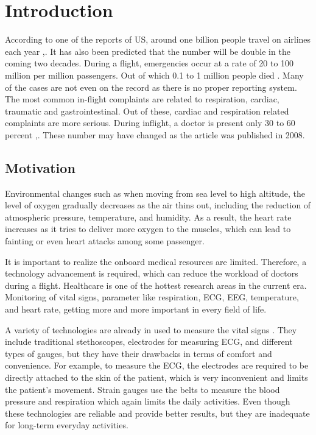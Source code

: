 \chapter{Introduction}

According to one of the reports of US, around one billion people travel on airlines each year \cite{PMC2577402},\cite{aerospace2003medical}. It has also been predicted that the number will be double in the coming two decades. During a flight, emergencies occur at a rate of 20 to 100 million per million passengers. Out of which 0.1 to 1 million people died \cite{lyznicki2000inflight}. Many of the cases are not even on the record as there is no proper reporting system. The most common in-flight complaints are related to respiration, cardiac, traumatic and gastrointestinal. Out of these, cardiac and respiration related complaints are more serious. During inflight, a doctor is present only 30 to 60 percent \cite{PMC2577402},\cite{PMC1119071}. These number may have changed as the article was published in 2008.


\section{Motivation}

Environmental changes such as when moving from sea level to high altitude, the level of oxygen gradually decreases as the air thins out, including the reduction of atmospheric pressure, temperature, and humidity. As a result, the heart rate increases as it tries to deliver more oxygen to the muscles, which can lead to fainting or even heart attacks among some passenger.

It is important to realize the onboard medical resources are limited. Therefore, a technology advancement is required, which can reduce the workload of doctors during a flight. Healthcare is one of the hottest research areas in the current era. Monitoring of vital signs, parameter like respiration, ECG, EEG, temperature, and heart rate, getting more and more important in every field of life.

A variety of technologies are already in used to measure the vital signs \cite{naturectlesshcs}. They include traditional stethoscopes, electrodes for measuring ECG, and different types of gauges, but they have their drawbacks in terms of comfort and convenience. For example, to measure the ECG, the electrodes are required to be directly attached to the skin of the patient, which is very inconvenient and limits the patient's movement. Strain gauges use the belts to measure the blood pressure and respiration which again limits the daily activities. Even though these technologies are reliable and provide better results, but they are inadequate for long-term everyday activities.

